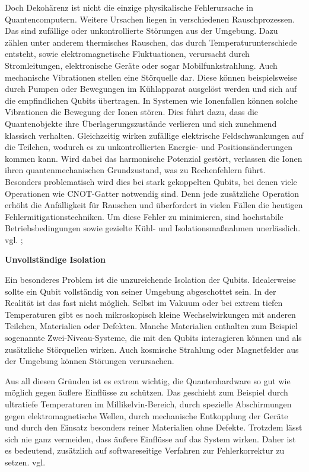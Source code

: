 Doch Dekohärenz ist nicht die einzige physikalische Fehlerursache in Quantencomputern. Weitere Ursachen liegen in verschiedenen Rauschprozessen. Das sind zufällige oder unkontrollierte Störungen aus der Umgebung. Dazu zählen unter anderem thermisches Rauschen, das durch Temperaturunterschiede entsteht, sowie elektromagnetische Fluktuationen, verursacht durch Stromleitungen, elektronische Geräte oder sogar Mobilfunkstrahlung. Auch mechanische Vibrationen stellen eine Störquelle dar. Diese können beispielsweise durch Pumpen oder Bewegungen im Kühlapparat ausgelöst werden und sich auf die empfindlichen Qubits übertragen. In Systemen wie Ionenfallen können solche Vibrationen die Bewegung der Ionen stören. Dies führt dazu, dass die Quantenobjekte ihre Überlagerungszustände verlieren und sich zunehmend klassisch verhalten. Gleichzeitig wirken zufällige elektrische Feldschwankungen auf die Teilchen, wodurch es zu unkontrollierten Energie- und Positionsänderungen kommen kann. Wird dabei das harmonische Potenzial gestört, verlassen die Ionen ihren quantenmechanischen Grundzustand, was zu Rechenfehlern führt. Besonders problematisch wird dies bei stark gekoppelten Qubits, bei denen viele Operationen wie CNOT-Gatter notwendig sind. Denn jede zusätzliche Operation erhöht die Anfälligkeit für Rauschen und überfordert in vielen Fällen die heutigen Fehlermitigationstechniken. Um diese Fehler zu minimieren, sind hochstabile Betriebsbedingungen sowie gezielte Kühl- und Isolationsmaßnahmen unerlässlich. vgl. \cite[Seite 39-43]{tutschke_quantencomputing_2023}; \cite[Seite 353-356]{nielsen_quantum_2010}\medskip



\textbf{Unvollständige Isolation}

Ein besonderes Problem ist die unzureichende Isolation der Qubits. Idealerweise sollte ein Qubit vollständig von seiner Umgebung abgeschottet sein. In der Realität ist das fast nicht möglich. Selbst im Vakuum oder bei extrem tiefen Temperaturen gibt es noch mikroskopisch kleine Wechselwirkungen mit anderen Teilchen, Materialien oder Defekten. Manche Materialien enthalten zum Beispiel sogenannte Zwei-Niveau-Systeme, die mit den Qubits interagieren können und als zusätzliche Störquellen wirken. Auch kosmische Strahlung oder Magnetfelder aus der Umgebung können Störungen verursachen.

Aus all diesen Gründen ist es extrem wichtig, die Quantenhardware so gut wie möglich gegen äußere Einflüsse zu schützen. Das geschieht zum Beispiel durch ultratiefe Temperaturen im Millikelvin-Bereich, durch spezielle Abschirmungen gegen elektromagnetische Wellen, durch mechanische Entkopplung der Geräte und durch den Einsatz besonders reiner Materialien ohne Defekte. Trotzdem lässt sich nie ganz vermeiden, dass äußere Einflüsse auf das System wirken. Daher ist es bedeutend, zusätzlich auf softwareseitige Verfahren zur Fehlerkorrektur zu setzen. vgl. \cite[Seite 24-26]{tutschke_quantencomputing_2023}



